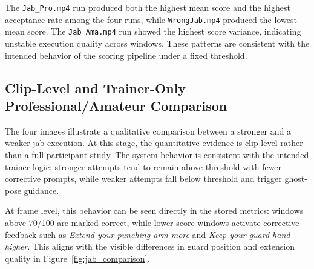 \documentclass[12pt]{article}
\begin{document}
\begin{table}[H]
\centering
{}
\caption{Run-level trainer acceptance summary from structured metrics logs.}
\label{tab:run_level_summary}
\end{table}

The \texttt{Jab\_Pro.mp4} run produced both the highest mean score and the highest acceptance rate among the four runs, while \texttt{WrongJab.mp4} produced the lowest mean score. The \texttt{Jab\_Ama.mp4} run showed the highest score variance, indicating unstable execution quality across windows. These patterns are consistent with the intended behavior of the scoring pipeline under a fixed threshold.

\subsection{Clip-Level and Trainer-Only Professional/Amateur Comparison}
The four images illustrate a qualitative comparison between a stronger and a weaker jab execution. At this stage, the quantitative evidence is clip-level rather than a full participant study. The system behavior is consistent with the intended trainer logic: stronger attempts tend to remain above threshold with fewer corrective prompts, while weaker attempts fall below threshold and trigger ghost-pose guidance.

At frame level, this behavior can be seen directly in the stored metrics: windows above 70/100 are marked correct, while lower-score windows activate corrective feedback such as \textit{Extend your punching arm more} and \textit{Keep your guard hand higher}. This aligns with the visible differences in guard position and extension quality in Figure~\ref{fig:jab_comparison}.
\end{document}
